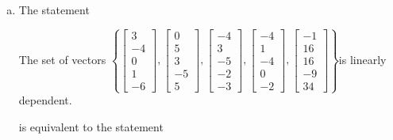 \begin{exerciseAnswer}
\begin{enumerate}[(a)]
\item The statement 
\begin{center}\begin{minipage}{0.8\textwidth}
 The set of vectors \( \left\{ \left[\begin{array}{c}
3 \\
-4 \\
0 \\
1 \\
-6
\end{array}\right] , \left[\begin{array}{c}
0 \\
5 \\
3 \\
-5 \\
5
\end{array}\right] , \left[\begin{array}{c}
-4 \\
3 \\
-5 \\
-2 \\
-3
\end{array}\right] , \left[\begin{array}{c}
-4 \\
1 \\
-4 \\
0 \\
-2
\end{array}\right] , \left[\begin{array}{c}
-1 \\
16 \\
16 \\
-9 \\
34
\end{array}\right] \right\} \)is linearly dependent.
\end{minipage}\end{center}
     is equivalent to the statement 
\begin{center}\begin{minipage}{0.8\textwidth}
 The vector equation \( x_{1} \left[\begin{array}{c}
3 \\
-4 \\
0 \\
1 \\
-6
\end{array}\right] + x_{2} \left[\begin{array}{c}
0 \\
5 \\

\end{array}
\end{minipage}
\end{center}
\end{enumerate}
\end{exerciseAnswer}
